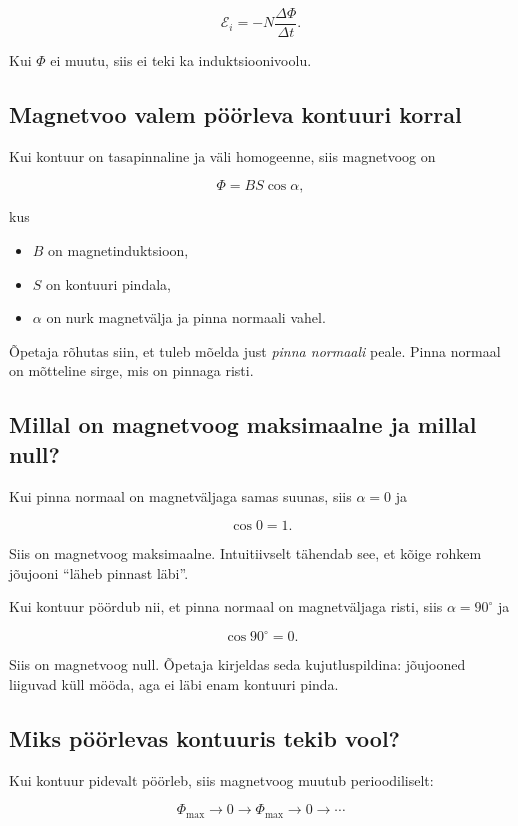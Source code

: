 \documentclass[a4paper,11pt]{article}
\begin{document}
\[
\mathcal{E}_i = -N\frac{\Delta \Phi}{\Delta t}.
\]

Kui \(\Phi\) ei muutu, siis ei teki ka induktsioonivoolu.

\subsection{Magnetvoo valem pöörleva kontuuri korral}

Kui kontuur on tasapinnaline ja väli homogeenne, siis magnetvoog on

\[
\Phi = BS\cos\alpha,
\]

kus
\begin{itemize}
    \item \(B\) on magnetinduktsioon,
    \item \(S\) on kontuuri pindala,
    \item \(\alpha\) on nurk magnetvälja ja pinna normaali vahel.
\end{itemize}

Õpetaja rõhutas siin, et tuleb mõelda just \emph{pinna normaali} peale. Pinna normaal on mõtteline sirge, mis on pinnaga risti.

\subsection{Millal on magnetvoog maksimaalne ja millal null?}

Kui pinna normaal on magnetväljaga samas suunas, siis \(\alpha = 0\) ja

\[
\cos 0 = 1.
\]

Siis on magnetvoog maksimaalne. Intuitiivselt tähendab see, et kõige rohkem jõujooni ``läheb pinnast läbi''.

Kui kontuur pöördub nii, et pinna normaal on magnetväljaga risti, siis \(\alpha = 90^\circ\) ja

\[
\cos 90^\circ = 0.
\]

Siis on magnetvoog null. Õpetaja kirjeldas seda kujutluspildina: jõujooned liiguvad küll mööda, aga ei läbi enam kontuuri pinda.

\subsection{Miks pöörlevas kontuuris tekib vool?}

Kui kontuur pidevalt pöörleb, siis magnetvoog muutub perioodiliselt:

\[
\Phi_{\max} \rightarrow 0 \rightarrow \Phi_{\max} \rightarrow 0 \rightarrow \cdots
\]
\end{document}
